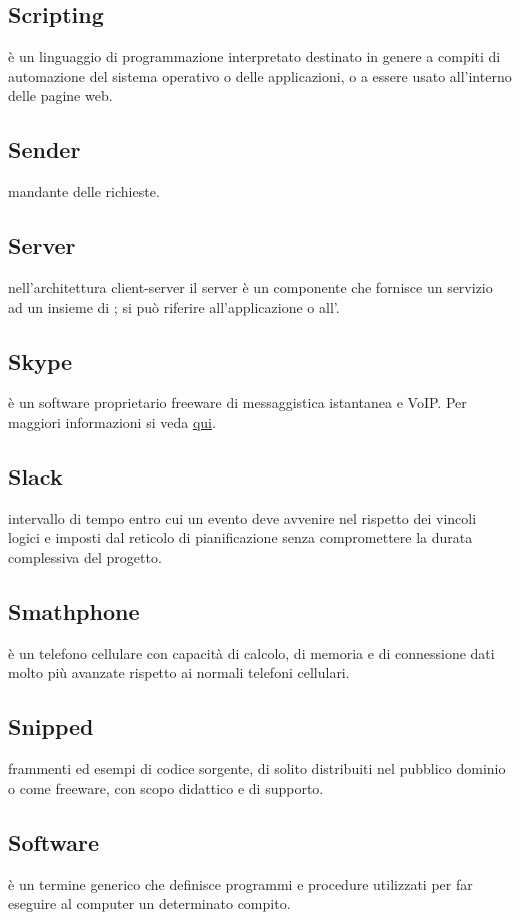 \documentclass[12pt,a4paper]{article}
\begin{document}
\subsection{Scripting} 
è un linguaggio di programmazione interpretato destinato in genere a compiti di automazione del sistema operativo o delle applicazioni, o a essere usato all'interno delle pagine web.

\subsection{Sender} 
mandante delle richieste.

\subsection{Server} 
nell'architettura client-server il server è un componente che fornisce un servizio ad un insieme di ; si può riferire all'applicazione o all'.

\subsection{Skype} 
è un software proprietario freeware di messaggistica istantanea e VoIP. Per maggiori informazioni si veda \href{https://it.wikipedia.org/wiki/Skype}{qui}.

\subsection{Slack} 
intervallo di tempo entro cui un evento deve avvenire nel rispetto dei vincoli logici e imposti dal reticolo di pianificazione senza compromettere la durata complessiva del progetto.

\subsection{Smathphone} 
è un telefono cellulare con capacità di calcolo, di memoria e di connessione dati molto più avanzate rispetto ai normali telefoni cellulari.

\subsection{Snipped} 
frammenti ed esempi di codice sorgente, di solito distribuiti nel pubblico dominio o come freeware, con scopo didattico e di supporto.

\subsection{Software} 
è un termine generico che definisce programmi e procedure utilizzati per far eseguire al computer un determinato compito.
\end{document}
